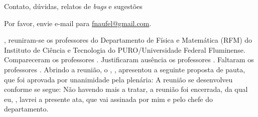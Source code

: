 \documentclass[12pt,a4paper,euler,beton]{ata}
\begin{document}
\begin{ponto}{Contato, dúvidas, relatos de \emph{bugs} e sugestões}

  Por favor, envie e-mail para \url{fnaufel@gmail.com}.

\end{ponto}



%

\hojeporextenso, reuniram-se \tiporeuniaoadv{} os professores do
Departamento de Física e Matemática (RFM) do Instituto de Ciência e
Tecnologia do PURO/Universidade Federal Fluminense.
%
Compareceram os professores \presentes. 
%
Justificaram ausência os professores \justificados.
%
Faltaram os professores \ausentes.
%
Abrindo a reunião, o \prof \presidiu, \cargopresidiu, apresentou a
seguinte proposta de pauta, que foi aprovada por unanimidade pela
plenária:
%
\pauta
%
A reunião se desenvolveu conforme se segue:
% 
\desenvolvimento
% 
Não havendo mais a tratar, a reunião foi encerrada, da qual eu,
\secretariou, lavrei a presente ata, que vai assinada por mim e pelo
chefe do departamento.
%
\end{document}
